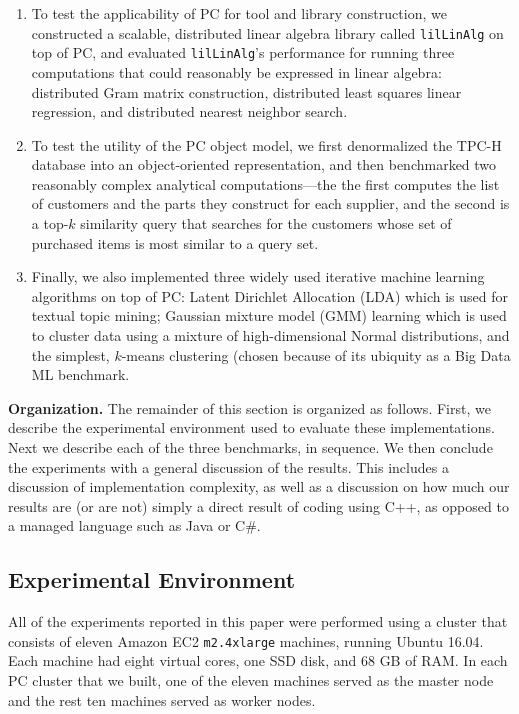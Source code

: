 \begin {enumerate}
\item To test the applicability of PC for tool and library construction, we constructed a scalable, distributed
linear algebra library
called \texttt{lilLinAlg} on top of PC, and evaluated \texttt{lilLinAlg}'s performance for running three
computations that could reasonably be expressed in linear algebra: distributed Gram matrix construction, 
distributed least squares linear regression, and distributed nearest neighbor search.

\item To test the utility of the PC object model, we first denormalized the TPC-H database \cite{council2008tpc} into an object-oriented 
representation, and then benchmarked two reasonably complex 
analytical computations---the
the first computes the list of customers and the parts they construct for each supplier, and the
second is a top-$k$ similarity query that searches for the customers whose set of purchased items is most similar
to a query set.

\item Finally, we also implemented three widely used
  iterative machine learning algorithms on top of PC: Latent Dirichlet Allocation (LDA) which is used for
  textual topic mining;
  Gaussian mixture model (GMM) learning which is used to cluster data using a mixture of high-dimensional Normal
  distributions, and the simplest, $k$-means clustering (chosen because of its ubiquity as a Big Data ML benchmark.
\end {enumerate}

\vspace{5 pt}
\noindent
\textbf{Organization.}  The remainder of this section is organized as follows.  First, we describe the experimental
environment used to evaluate these implementations.  
Next we describe each of the three benchmarks, in sequence. We then conclude the experiments with a general
discussion of the results.  This includes a discussion of implementation complexity, as well as a discussion on how much
our results are (or are not) simply a direct result of coding using C++, as opposed to a managed language such as Java or
C\#.

\subsection {Experimental Environment}

All of the experiments reported in this paper were performed using a
cluster that consists of eleven Amazon EC2 \texttt{m2.4xlarge} machines,
running Ubuntu 16.04. Each machine had eight virtual cores, one SSD
disk, and 68 GB of RAM. In each PC cluster that we built, one of the eleven machines served as the master
node and the rest ten machines served as worker nodes.

